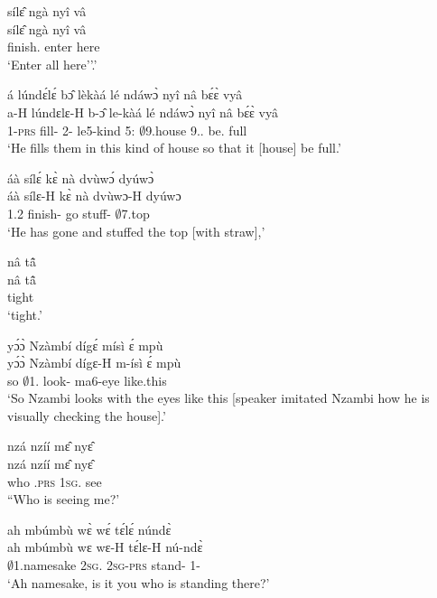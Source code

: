 \begin{exe}[(N234)]
\exN\label{n152}
  \glll sílɛ̂ ngà nyî vâ \\
       sílɛ̂ ngà nyî vâ \\
        finish.{\IMP}  {\PL}  enter here \\
    \trans `Enter all here''.'
 
\exN\label{n153}
  \glll á lúndɛ́lɛ́ bɔ̂ lèkàá lé ndáwɔ̀ nyî nâ bɛ́ɛ̀ vyâ \\
       a-H lúndɛlɛ-H b-ɔ̂ le-kàá lé ndáwɔ̀ nyî nâ bɛ́ɛ̀ vyâ \\
       1-\textsc{prs} fill-{\R} 2-{\OBJ} le5-kind 5:{\ATT}  $\emptyset$9.house 9.{\DEM}.{\PROX} {\COMP} be.{\SBJV}  full \\
    \trans `He fills them in this kind of house so that it [house] be full.'
 
\exN\label{n154}
  \glll áà sílɛ́ kɛ̀ nà dvùwɔ́ dyúwɔ̀ \\
     áà sílɛ-H kɛ̀ nà dvùwɔ-H dyúwɔ \\
        1.{\PST}2 finish-{\R} go {\CONJ} stuff-{\R} $\emptyset$7.top \\
    \trans `He has gone and stuffed the top [with straw],'
 
\exN\label{n155} 
  \glll nâ tã̂ \\
       nâ tã̂ \\
       {\COMP} tight  \\
    \trans `tight.'
 
\exN\label{n156}
  \glll yɔ́ɔ̀ Nzàmbí dígɛ́ mísì ɛ́ mpù \\
      yɔ́ɔ̀ Nzàmbí dígɛ-H m-ísì ɛ́ mpù \\
       so $\emptyset$1.{\PN} look-{\R} ma6-eye {\LOC} like.this  \\
    \trans `So Nzambi looks with the eyes like this [speaker imitated Nzambi how he is visually checking the house].'
 
\exN\label{n157}
  \glll nzá nzíí mɛ̂ nyɛ̂ \\
    nzá nzíí mɛ̂ nyɛ̂ \\
         who {\PROG}.\textsc{prs} 1\textsc{sg}.{\OBJ} see\\
    \trans ``Who is seeing me?'
 
\exN\label{n158} 
  \glll ah mbúmbù wɛ̀ wɛ́ tɛ́lɛ́ núndɛ̀ \\
      ah mbúmbù wɛ wɛ-H tɛ́lɛ-H nú-ndɛ̀ \\
        {\EXCL} $\emptyset$1.namesake 2\textsc{sg}.{\SBJ}  2\textsc{sg}-\textsc{prs} stand-{\R} 1-{\ANA} \\
    \trans `Ah namesake, is it you who is standing there?'
 

\end{exe}
